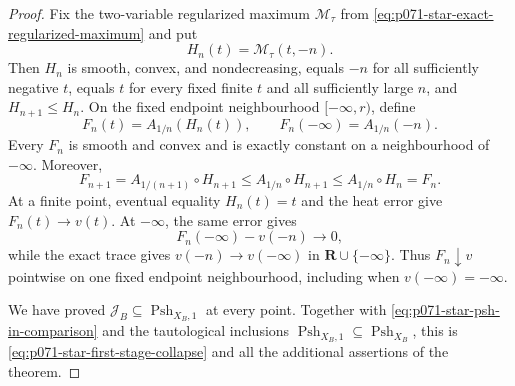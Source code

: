 \begin{proof}
Fix the two-variable regularized maximum
\(\mathcal M_\tau\) from
\eqref{eq:p071-star-exact-regularized-maximum} and put
\[
                         H_n(t)=\mathcal M_\tau(t,-n).
\]
Then \(H_n\) is smooth, convex, and nondecreasing, equals \(-n\) for
all sufficiently negative \(t\), equals \(t\) for every fixed finite
\(t\) and all sufficiently large \(n\), and
\(H_{n+1}\leq H_n\).  On the fixed endpoint neighbourhood
\([-\infty,r)\), define
\[
 F_n(t)=A_{1/n}(H_n(t)),\qquad
 F_n(-\infty)=A_{1/n}(-n).
\]
Every \(F_n\) is smooth and convex and is exactly constant on a
neighbourhood of \(-\infty\).  Moreover,
\[
 F_{n+1}=A_{1/(n+1)}\circ H_{n+1}
      \leq A_{1/n}\circ H_{n+1}
      \leq A_{1/n}\circ H_n=F_n.
\]
At a finite point, eventual equality \(H_n(t)=t\) and the heat error
give \(F_n(t)\to v(t)\).  At \(-\infty\), the same error gives
\[
             F_n(-\infty)-v(-n)\longrightarrow0,
\]
while the exact trace gives
\(v(-n)\to v(-\infty)\) in
\(\mathbf R\cup\{-\infty\}\).  Thus \(F_n\downarrow v\) pointwise on
one fixed endpoint neighbourhood, including when
\(v(-\infty)=-\infty\).

We have proved
\(\mathscr J_B\subseteq\operatorname{Psh}_{X_B,1}\) at every point.
Together with \eqref{eq:p071-star-psh-in-comparison} and the tautological
inclusions
\(\operatorname{Psh}_{X_B,1}\subseteq\operatorname{Psh}_{X_B}\), this is
\eqref{eq:p071-star-first-stage-collapse} and all the additional
assertions of the theorem.
\end{proof}
